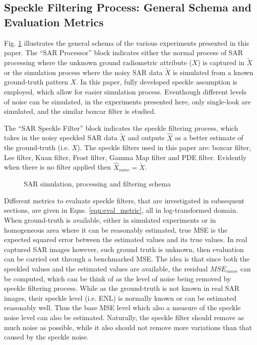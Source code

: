 \documentclass[journal]{IEEEtran}
\begin{document}
\subsection{ Speckle Filtering Process: General Schema and Evaluation Metrics }

Fig. \ref{fig:simul_process_filter_schema} illustrates the general schema of the various experiments presented in this paper.
The ``SAR Processor'' block indicates either 
	the normal process of SAR processing where the unknown ground radiometric attribute ($X$) is captured in $\tilde{X}$ or
	the simulation process where the noisy SAR data $\tilde{X}$ is simulated from a known ground-truth pattern $X$.
In this paper, fully developed speckle assumption is employed, which allow for easier simulation process.	
Eventhough different levels of noise can be simulated, in the experiments presented here, only single-look are simulated, and the similar boxcar filter is studied.

The ``SAR Speckle Filter'' block indicates the speckle filtering process, 
	which takes in the noisy speckled SAR data $\tilde{X}$ 
		and outputs $\hat{X}$ as a better estimate of the ground-truth (i.e. $X$).
The speckle filters used in this paper are: 
	boxcar filter, Lee filter, Kuan filter, Frost filter, Gamma Map filter and PDE filter.
Evidently when there is no filter applied then $\hat{X}_{none} = \tilde{X}$.	

\begin{figure}
 \centering
 \epsfxsize=3in
 \epsfysize=1.5in
\caption{SAR simulation, processing and filtering schema}
\label{fig:simul_process_filter_schema}
\end{figure}

Different metrics to evaluate speckle filters, that are investigated in subsequent sections, are given in Eqns. \ref{eqn:eval_metric}, all in log-transformed domain.
When ground-truth is available, 
	either in simulated experiments or in homogeneous area where it can be reasonably estimated, true MSE is the expected squared error between the estimated values and its true values.
In real captured SAR images however, such ground truth is unknown, then evaluation can be carried out through a benchmarked MSE. 
The idea is that since both the speckled values and the estimated values are available, the residual $MSE_{noise}$ can be computed, which can be think of as the level of noise being removed by speckle filtering process.
While as the ground-truth is not known in real SAR images, their speckle level (i.e. ENL) is normally known or can be estimated reasonably well.
Thus the base MSE level which also a measure of the speckle noise level can also be estimated.
Naturally, the speckle filter should remove as much noise as possible, 
	while it also should not remove more variations than that caused by the speckle noise.
\end{document}
